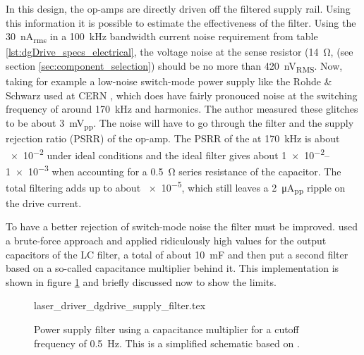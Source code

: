 In this design, the op-amps are directly driven off the filtered supply rail. Using this information it is possible to estimate the effectiveness of the filter. Using the \qty{30}{\nA_{rms}} in a \qty{100}{\kHz} bandwidth current noise requirement from table \ref{lst:dgDrive_specs_electrical}, the voltage noise at the sense resistor (\qty{14}{\ohm}, (see section \ref{sec:component_selection}) should be no more than \qty{420}{\nV_{RMS}}. Now, taking for example a low-noise switch-mode power supply like the Rohde \& Schwarz  used at CERN \cite{hmp4040_noise}, which does have fairly pronouced noise at the switching frequency of around \qty{170}{\kHz} and harmonics. The author measured these glitches to be about \qty{3}{\mV_{pp}}. The noise will have to go through the filter and the supply rejection ratio (PSRR) of the op-amp. The PSRR of the  at \qty{170}{\kHz} is about \num{e-2} under ideal conditions \cite{datasheet_LT1028} and the ideal filter gives about \numrange{1e-2}{1e-3} when accounting for a \qty{0.5}{\ohm} series resistance of the capacitor. The total filtering adds up to about \num{e-5}, which still leaves a \qty{2}{\uA_{pp}} ripple on the drive current.

To have a better rejection of switch-mode noise the filter must be improved. \citeauthor{laser_driver_qcl_taubman} used a brute-force approach \cite{laser_driver_qcl_taubman} and applied ridiculously high values for the output capacitors of the LC filter, a total of about \qty{10}{\milli\farad} and then put a second filter based on a so-called capacitance multiplier behind it. This implementation is shown in figure \ref{fig:laser_driver_taubman_filter} and briefly discussed now to show the limits.

\begin{figure}[ht]
    \centering
        {laser_driver_dgdrive_supply_filter.tex}
    \caption{Power supply filter using a capacitance multiplier for a cutoff frequency of \qty{0.5}{\Hz}. This is a simplified schematic based on \cite{laser_driver_qcl_taubman}.}
    \label{fig:laser_driver_taubman_filter}
\end{figure}

